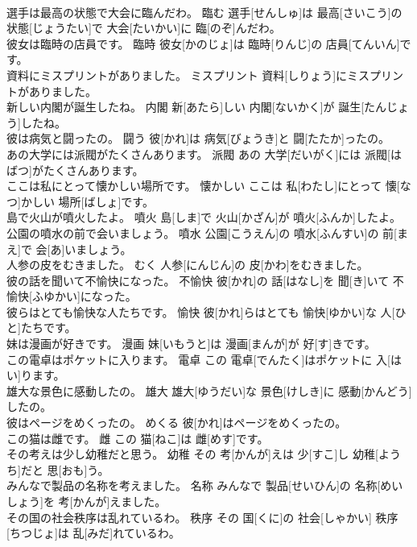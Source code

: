 \documentclass[8pt]{extreport}
\begin{document}
\begin{CJK}{UTF8}{min}
\\	選手は最高の状態で大会に臨んだわ。	臨む	選手[せんしゅ]は 最高[さいこう]の 状態[じょうたい]で 大会[たいかい]に 臨[のぞ]んだわ。	
\\	彼女は臨時の店員です。	臨時	彼女[かのじょ]は 臨時[りんじ]の 店員[てんいん]です。	
\\	資料にミスプリントがありました。	ミスプリント	資料[しりょう]にミスプリントがありました。	
\\	新しい内閣が誕生したね。	内閣	新[あたら]しい 内閣[ないかく]が 誕生[たんじょう]したね。	
\\	彼は病気と闘ったの。	闘う	彼[かれ]は 病気[びょうき]と 闘[たたか]ったの。	
\\	あの大学には派閥がたくさんあります。	派閥	あの 大学[だいがく]には 派閥[はばつ]がたくさんあります。	
\\	ここは私にとって懐かしい場所です。	懐かしい	ここは 私[わたし]にとって 懐[なつ]かしい 場所[ばしょ]です。	
\\	島で火山が噴火したよ。	噴火	島[しま]で 火山[かざん]が 噴火[ふんか]したよ。	
\\	公園の噴水の前で会いましょう。	噴水	公園[こうえん]の 噴水[ふんすい]の 前[まえ]で 会[あ]いましょう。	
\\	人参の皮をむきました。	むく	人参[にんじん]の 皮[かわ]をむきました。	
\\	彼の話を聞いて不愉快になった。	不愉快	彼[かれ]の 話[はなし]を 聞[き]いて 不愉快[ふゆかい]になった。	
\\	彼らはとても愉快な人たちです。	愉快	彼[かれ]らはとても 愉快[ゆかい]な 人[ひと]たちです。	
\\	妹は漫画が好きです。	漫画	妹[いもうと]は 漫画[まんが]が 好[す]きです。	
\\	この電卓はポケットに入ります。	電卓	この 電卓[でんたく]はポケットに 入[はい]ります。	
\\	雄大な景色に感動したの。	雄大	雄大[ゆうだい]な 景色[けしき]に 感動[かんどう]したの。	
\\	彼はページをめくったの。	めくる	彼[かれ]はページをめくったの。	
\\	この猫は雌です。	雌	この 猫[ねこ]は 雌[めす]です。	
\\	その考えは少し幼稚だと思う。	幼稚	その 考[かんが]えは 少[すこ]し 幼稚[ようち]だと 思[おも]う。	
\\	みんなで製品の名称を考えました。	名称	みんなで 製品[せいひん]の 名称[めいしょう]を 考[かんが]えました。	
\\	その国の社会秩序は乱れているわ。	秩序	その 国[くに]の 社会[しゃかい] 秩序[ちつじょ]は 乱[みだ]れているわ。	

\end{CJK}
\end{document}
